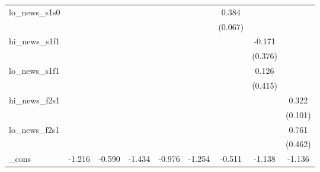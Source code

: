 {\begin{tabular}{l*{8}{c}}
\addlinespace
lo\_news\_s1s0&                     &                     &                     &                     &                     &       0.384\sym{***}&                     &                     \\
            &                     &                     &                     &                     &                     &     (0.067)         &                     &                     \\
\addlinespace
hi\_news\_s1f1&                     &                     &                     &                     &                     &                     &      -0.171         &                     \\
            &                     &                     &                     &                     &                     &                     &     (0.376)         &                     \\
\addlinespace
lo\_news\_s1f1&                     &                     &                     &                     &                     &                     &       0.126         &                     \\
            &                     &                     &                     &                     &                     &                     &     (0.415)         &                     \\
\addlinespace
hi\_news\_f2s1&                     &                     &                     &                     &                     &                     &                     &       0.322\sym{***}\\
            &                     &                     &                     &                     &                     &                     &                     &     (0.101)         \\
\addlinespace
lo\_news\_f2s1&                     &                     &                     &                     &                     &                     &                     &       0.761         \\
            &                     &                     &                     &                     &                     &                     &                     &     (0.462)         \\
\addlinespace
\_cons      &      -1.216\sym{*}  &      -0.590\sym{**} &      -1.434\sym{***}&      -0.976\sym{*}  &      -1.254\sym{***}&      -0.511\sym{**} &      -1.138\sym{***}&      -1.136\sym{***}\\

\end{tabular}}
